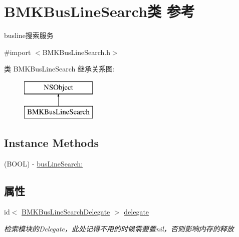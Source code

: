 \hypertarget{interface_b_m_k_bus_line_search}{\section{B\+M\+K\+Bus\+Line\+Search类 参考}
\label{interface_b_m_k_bus_line_search}
}


busline搜索服务  




{\ttfamily \#import $<$B\+M\+K\+Bus\+Line\+Search.\+h$>$}

类 B\+M\+K\+Bus\+Line\+Search 继承关系图\+:\begin{figure}[H]
\begin{center}
\leavevmode
\includegraphics[height=2.000000cm]{interface_b_m_k_bus_line_search}
\end{center}
\end{figure}
\subsection*{Instance Methods}
\begin{DoxyCompactItemize}
\item 
(B\+O\+O\+L) -\/ \hyperlink{interface_b_m_k_bus_line_search_a652cac8a9fbaa46ddd7a0b09f5af8644}{bus\+Line\+Search\+:}
\end{DoxyCompactItemize}
\subsection*{属性}
\begin{DoxyCompactItemize}
\item 
\hypertarget{interface_b_m_k_bus_line_search_a87ccf434516c41498d6744f988e748a4}{id$<$ \hyperlink{protocol_b_m_k_bus_line_search_delegate-p}{B\+M\+K\+Bus\+Line\+Search\+Delegate} $>$ \hyperlink{interface_b_m_k_bus_line_search_a87ccf434516c41498d6744f988e748a4}{delegate}}\label{interface_b_m_k_bus_line_search_a87ccf434516c41498d6744f988e748a4}

\begin{DoxyCompactList}\small\item\em 检索模块的\+Delegate，此处记得不用的时候需要置nil，否则影响内存的释放 \end{DoxyCompactList}\end{DoxyCompactItemize}


